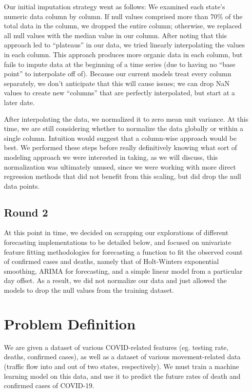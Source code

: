 \documentclass[sigconf,nonacm]{acmart}
\begin{document}
Our initial imputation strategy went as follows: We examined each state’s
numeric data column by column. If null values comprised more than 70\% of the
total data in the column, we dropped the entire column; otherwise, we replaced
all null values with the median value in our column. After noting that this
approach led to “plateaus” in our data, we tried linearly interpolating the
values in each column. This approach produces more organic data in each column,
but fails to impute data at the beginning of a time series (due to having no
“base point” to interpolate off of). Because our current models treat every
column separately, we don’t anticipate that this will cause issues; we can drop
NaN values to create new “columns” that are perfectly interpolated, but start
at a later date.  

After interpolating the data, we normalized it to zero mean unit variance. At
this time, we are still considering whether to normalize the data globally or
within a single column. Intuition would suggest that a column-wise approach
would be best. We performed these steps before really definitively knowing what
sort of modeling approach we were interested in taking, as we will discuss,
this normalization was ultimately unused, since we were working with more
direct regression methods that did not benefit from this scaling, but did drop
the null data points.

\subsection{Round 2}

At this point in time, we decided on scrapping our explorations of different
forecasting implementations to be detailed below, and focused on univariate
feature fitting methodologies for forecasting a function to fit the observed
count of confirmed cases and deaths, namely that of Holt-Winters exponential
smoothing, ARIMA for forecasting, and a simple linear model from a particular
day offset. As a result, we did not normalize our data and just allowed the
models to drop the null values from the training dataset.


\section{Problem Definition}

We are given a dataset of various COVID-related features (eg. testing rate,
deaths, confirmed cases), as well as a dataset of various movement-related data
(traffic flow into and out of two states, respectively). 
We must train a machine learning model on this data, and use it to predict the
future rates of death and confirmed cases of COVID-19. 
\end{document}

